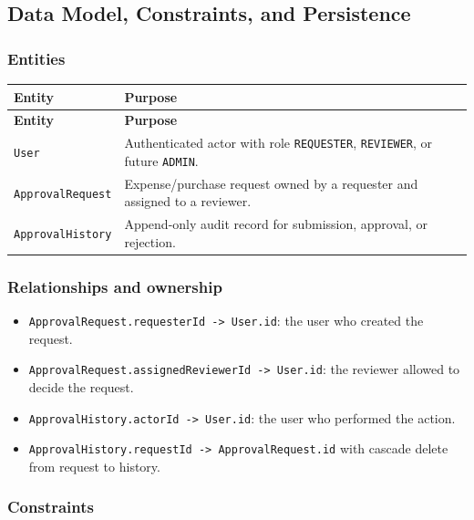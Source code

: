 \documentclass[11pt,a4paper]{article}
\begin{document}
\subsection{Data Model, Constraints, and Persistence}

\subsubsection{Entities}

\vspace{0.3em}
\begin{longtable}{|>{\RaggedRight}p{4.5cm}|>{\RaggedRight}p{11.3cm}|}
\hline
\rowcolor{zenPale}\textbf{Entity} & \textbf{Purpose} \\ \hline
\endfirsthead
\hline
\rowcolor{zenPale}\textbf{Entity} & \textbf{Purpose} \\ \hline
\endhead
\hline
\endfoot
\texttt{User} & Authenticated actor with role \texttt{REQUESTER}, \texttt{REVIEWER}, or future \texttt{ADMIN}. \\ \hline
\texttt{ApprovalRequest} & Expense/purchase request owned by a requester and assigned to a reviewer. \\ \hline
\texttt{ApprovalHistory} & Append-only audit record for submission, approval, or rejection. \\ \hline
\end{longtable}
\vspace{0.3em}

\subsubsection{Relationships and ownership}

\begin{itemize}[leftmargin=*,itemsep=2pt,topsep=2pt]
  \item \texttt{ApprovalRequest.requesterId -> User.id}: the user who created the request.
  \item \texttt{ApprovalRequest.assignedReviewerId -> User.id}: the reviewer allowed to decide the request.
  \item \texttt{ApprovalHistory.actorId -> User.id}: the user who performed the action.
  \item \texttt{ApprovalHistory.requestId -> ApprovalRequest.id} with cascade delete from request to history.
\end{itemize}
\subsubsection{Constraints}
\end{document}
